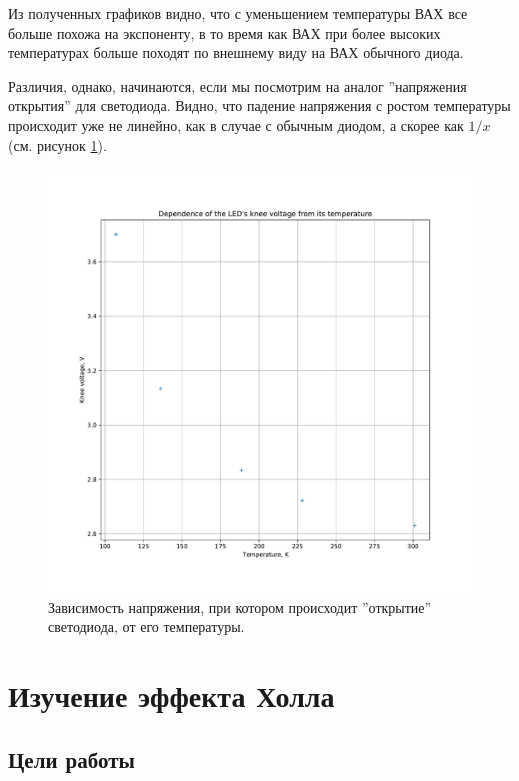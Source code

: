 \documentclass[a4paper, 12pt]{article}
\begin{document}
Из полученных графиков видно, что с уменьшением температуры ВАХ все больше похожа на экспоненту, в то время как ВАХ при более высоких температурах больше походят по внешнему виду на ВАХ обычного диода.

Различия, однако, начинаются, если мы посмотрим на аналог ''напряжения открытия'' для светодиода. Видно, что падение напряжения с ростом температуры происходит уже не линейно, как в случае с обычным диодом, а скорее как $1/x$ (см. рисунок \ref{fig:2_Knee_LED}).

\begin{figure}[H]
	\centering
	\includegraphics[width=\linewidth]{2_Knee_LED}
	\caption{Зависимость напряжения, при котором происходит ''открытие'' светодиода, от его температуры.}
	\label{fig:2_Knee_LED}
\end{figure}

\newpage

\section{Изучение эффекта Холла}

\subsection{Цели работы}
\end{document}
